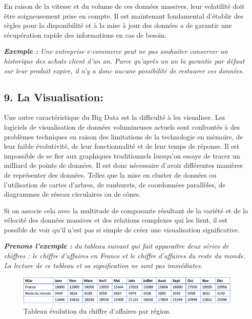 En raison de la vitesse et du volume de ces données massives, leur volatilité doit être soigneusement prise en compte. Il est maintenant fondamental d'établir des règles pour la disponibilité et à la mise à jour des données a de garantir une récupération rapide des informations en cas de besoin.

\textit{\textbf{Exemple :} Une entreprise e-commerce peut ne pas souhaiter conserver un historique des achats client d'un an. Parce qu'après un an la garantie par défaut sur leur produit expire, il n'y a donc aucune possibilité de restaurer ces données.}

\subsection*{9. La Visualisation:}
Une autre caractéristique du Big Data est la difficulté à les visualiser. Les logiciels de visualisation de données volumineuses actuels sont confrontés à des problèmes techniques en raison des limitations de la technologie en mémoire, de leur faible évolutivité, de leur fonctionnalité et de leur temps de réponse. Il est impossible de se fier aux graphiques traditionnels lorsqu'on essaye de tracer un milliard de points de données. Il est donc nécessaire d'avoir différentes manières de représenter des données. Telles que la mise en cluster de données ou l'utilisation de cartes d'arbres, de sunbursts, de coordonnées parallèles, de diagrammes de réseau circulaires ou de cônes. 

Si on associe cela avec la multitude de composante résultant de la variété et de la vélocité des données massives et des relations complexes qui les lient, il est possible de voir qu'il n'est pas si simple de créer une visualisation significative.

\textit{\textbf{Prenons l'exemple :} du tableau suivant qui fait apparaître deux séries de chiffres : le chiffre d'affaires en France et le chiffre d'affaires du reste du monde. La lecture de ce tableau et sa signification ne sont pas immédiates.}

\begin{figure}[h]
	\centering
	\includegraphics[scale=0.4]{img/part1/1.4}
	\caption{Tableau évolution du chiffre d'affaires par région.}
\end{figure}

